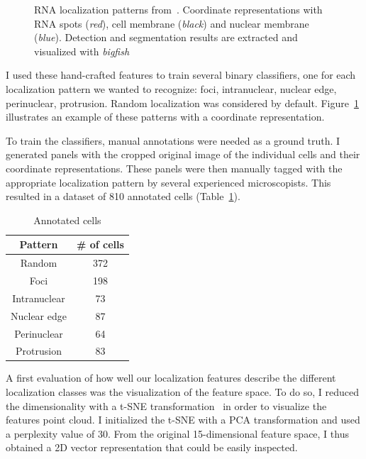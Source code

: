 \begin{figure}[]
	\endminipage
	\caption[RNA localization patterns]{RNA localization patterns from~\cite{CHOUAIB_2020}.
	Coordinate representations with RNA spots (\textit{red}), cell membrane (\textit{black}) and nuclear membrane (\textit{blue}).
	Detection and segmentation results are extracted and visualized with \emph{bigfish}}
	\label{fig:localization_patterns_racha_features}
\end{figure}

I used these hand-crafted features to train several binary classifiers, one for each localization pattern we wanted to recognize: foci, intranuclear, nuclear edge, perinuclear, protrusion.
Random localization was considered by default.
Figure~\ref{fig:localization_patterns_racha_features} illustrates an example of these patterns with a coordinate representation.

To train the classifiers, manual annotations were needed as a ground truth.
I generated panels with the cropped original image of the individual cells and their coordinate representations.
These panels were then manually tagged with the appropriate localization pattern by several experienced microscopists.
This resulted in a dataset of 810 annotated cells (Table~\ref{table:real_dataset_chapter5}).

\begin{table}
	\centering
	\begin{tabular}{| c | c |}
		\hline
		Pattern & \# of cells \\
		\hline
		Random & 372\\
		Foci & 198\\
		Intranuclear & 73\\
		Nuclear edge & 87\\
		Perinuclear & 64\\
		Protrusion & 83\\
		\hline
	\end{tabular}
	\caption[Count of annotated cells]{Annotated cells}
	\label{table:real_dataset_chapter5}
\end{table}

A first evaluation of how well our localization features describe the different localization classes was the visualization of the feature space.
To do so, I reduced the dimensionality with a \ac{t-SNE} transformation~\cite{vandermaaten_2008} in order to visualize the features point cloud.
I initialized the \ac{t-SNE} with a PCA transformation and used a perplexity value of 30.
From the original 15-dimensional feature space, I thus obtained a 2D vector representation that could be easily inspected.

